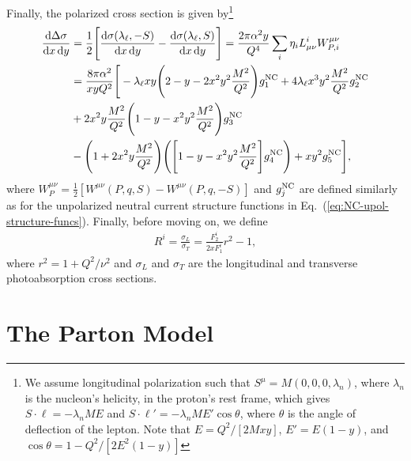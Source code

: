 \documentclass[aps,prd,amsmath,superscriptaddress,floatfix,nofootinbib]{revtex4-2}
\newcommand{\diff}[1]{{\rm d} #1}
\newcommand{\eref}[1]{Eq.~(\ref{eq:#1})}
\begin{document}
Finally, the polarized cross section is given by\footnote{We assume longitudinal polarization such that $S^{\mu} = M(0,0,0,\lambda_{n})$, where $\lambda_{n}$ is the nucleon's helicity, in the proton's rest frame, which gives $S \cdot \ell = - \lambda_{n} M E$ and $S \cdot \ell' = -\lambda_{n} M E' \cos{\theta}$, where $\theta$ is the angle of deflection of the lepton. Note that $E = Q^2/[2Mxy]$, $E' = E(1-y)$, and $\cos{\theta} = 1 - Q^2/[2E^2(1-y)]$}
\begin{eqnarray}
    \label{eq:pol-xsec}
    \begin{aligned}    
        \frac{\diff \Delta \sigma}{\diff x \, \diff y} &= \frac{1}{2} \Bigg[ \frac{\diff \sigma(\lambda_{\ell},-S)}{\diff x \, \diff y} - \frac{\diff \sigma(\lambda_{\ell},S)}{\diff x \, \diff y} \Bigg] = \frac{2 \pi \alpha^2 y}{Q^{4}} \sum_{i} \eta_{i} L_{\mu\nu}^{i} W^{\mu\nu}_{P,i} \\
        &= \frac{8 \pi \alpha^2}{x y Q^2} \Bigg[ -\lambda_{\ell} xy \Bigg( 2 - y - 2x^2y^2 \frac{M^2}{Q^2} \Bigg) g_1^{\rm NC} + 4 \lambda_{\ell} x^3 y^2 \frac{M^2}{Q^2} g_2^{\rm NC} \\
        &+ 2x^2y \frac{M^2}{Q^2} \Bigg( 1 - y - x^2y^2 \frac{M^2}{Q^2} \Bigg) g_3^{\rm NC} \\
        &- \Bigg( 1 + 2x^2y \frac{M^2}{Q^2} \Bigg) \Bigg( \Bigg[ 1 - y - x^2y^2 \frac{M^2}{Q^2} \Bigg] g_4^{\rm NC} \Bigg) + xy^2 g_5^{\rm NC} \Bigg]
    ,\end{aligned}
\end{eqnarray}
where $W^{\mu\nu}_{P} = \frac{1}{2} [ W^{\mu\nu}(P,q,S) - W^{\mu\nu}(P,q,-S) ]$ and $g^{\rm NC}_{j}$ are defined similarly as for the unpolarized neutral current structure functions in \eref{NC-upol-structure-funcs}.
Finally, before moving on, we define
\begin{eqnarray}
    \label{eq:ratio}
    R^{i} = \frac{\sigma_{L}}{\sigma_{T}} = \frac{F_{2}^{i}}{2xF_{1}^{i}} r^2 - 1
,\end{eqnarray}
where $r^2 = 1 + Q^2/\nu^2$ and $\sigma_{L}$ and $\sigma_{T}$ are the longitudinal and transverse photoabsorption cross sections.


\section{The Parton Model}
\label{sec:the-naive-parton-model}
\end{document}
